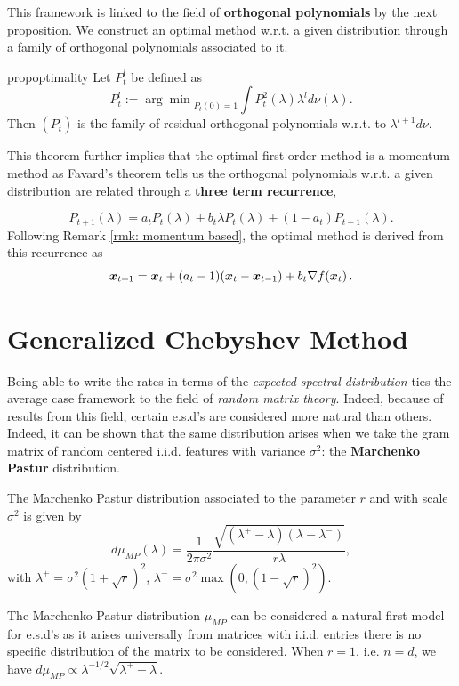 \documentclass{article}
\begin{document}
This framework is  linked to the field of \textbf{orthogonal polynomials} by the next proposition. We construct an optimal method w.r.t. a given distribution through a family  of orthogonal polynomials associated to it.


\begin{restatable}{prop}{optimality}\citep{pedregosa2020acceleration}
 \label{prop: optimality}
 Let $P_t^l$ be defined as
 \begin{equation}
     P_t^l:={\arg \min}_{P_t(0)=1} \int P_t^2(\lambda) \lambda^l d\nu(\lambda).
 \end{equation}
 Then $(P_t^l)$ is the family of residual orthogonal polynomials w.r.t. to $\lambda^{l+1}d\nu$.
\end{restatable}

This theorem further implies that the optimal first-order method is a momentum method as Favard's theorem \cite{marcellan2001favard} tells us the orthogonal polynomials w.r.t. a given distribution are related through a \textbf{three term recurrence},

\begin{equation}
    P_{t+1}(\lambda)=a_tP_t(\lambda)+b_t\lambda P_t(\lambda)+(1-a_t)P_{t-1}(\lambda).
\end{equation}
Following Remark \ref{rmk: momentum based}, the optimal method is derived from this recurrence as
\begin{equation}
    {\boldsymbol x}_{t+1}={\boldsymbol x}_t+(a_t-1)({\boldsymbol x}_t-{\boldsymbol x}_{t-1})+b_t\nabla f({\boldsymbol x}_t)\,.
\end{equation}



\section{Generalized Chebyshev Method} \label{section: methods}
Being able to write the rates in terms of the \textit{expected spectral distribution} ties the average case framework to the field of \textit{random matrix theory}. Indeed, because of results from this field, certain e.s.d's are considered more natural than others. Indeed, it can be shown that the same distribution arises when we take the gram matrix of random  centered i.i.d. features with variance $\sigma^2$: the \textbf{Marchenko Pastur} distribution. 

\begin{definition}
The  Marchenko Pastur distribution associated to the parameter  $r$ and with scale $\sigma^2$ is given by 
\begin{equation}
d\mu_{MP}(\lambda)=\frac{1}{2\pi\sigma^2}\frac{\sqrt{(\lambda^+-\lambda)(\lambda-\lambda^-)}}{r\lambda} ,
\end{equation}
with $\lambda^+=\sigma^2(1+\sqrt{r})^2$, $\lambda^-=\sigma^2\max(0,(1-\sqrt{r})^2)$.
\end{definition}
The Marchenko Pastur distribution $\mu_{MP}$ can be considered a natural first model for e.s.d's as it arises universally from matrices with i.i.d. entries there is no specific distribution of the matrix to be considered. When $r=1$, i.e. $n=d$, we have $d\mu_{MP}\propto \lambda^{-1/2}\sqrt{\lambda^+-\lambda}$. %
\end{document}
